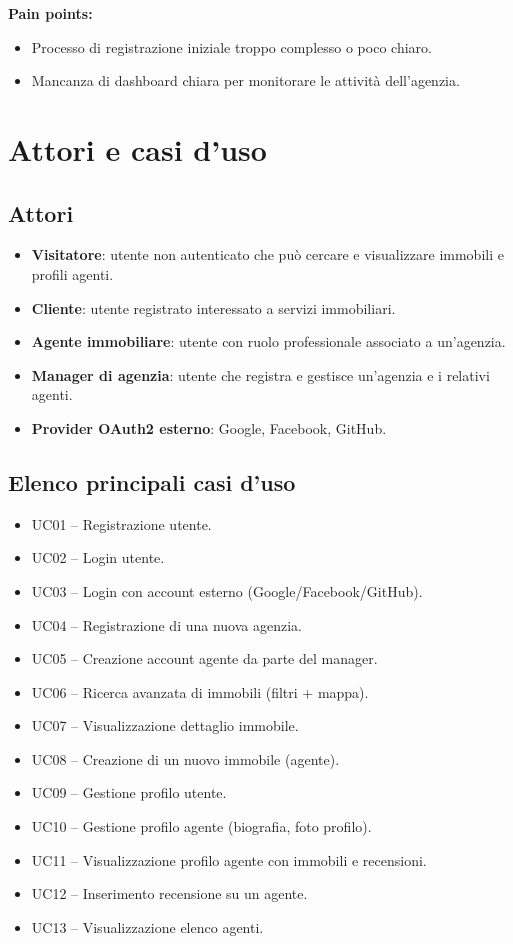 \documentclass[a4paper,11pt]{report}
\begin{document}
\textbf{Pain points:}
\begin{itemize}[nosep]
  \item Processo di registrazione iniziale troppo complesso o poco chiaro.
  \item Mancanza di dashboard chiara per monitorare le attività dell'agenzia.
\end{itemize}
\pagebreak

\section{Attori e casi d’uso}

\subsection{Attori}

\begin{itemize}[nosep]
  \item \textbf{Visitatore}: utente non autenticato che può cercare e visualizzare immobili e profili agenti.
  \item \textbf{Cliente}: utente registrato interessato a servizi immobiliari.
  \item \textbf{Agente immobiliare}: utente con ruolo professionale associato a un’agenzia.
  \item \textbf{Manager di agenzia}: utente che registra e gestisce un’agenzia e i relativi agenti.
  \item \textbf{Provider OAuth2 esterno}: Google, Facebook, GitHub.
\end{itemize}

\subsection{Elenco principali casi d’uso}

\begin{itemize}[nosep]
  \item UC01 -- Registrazione utente.
  \item UC02 -- Login utente.
  \item UC03 -- Login con account esterno (Google/Facebook/GitHub).
  \item UC04 -- Registrazione di una nuova agenzia.
  \item UC05 -- Creazione account agente da parte del manager.
  \item UC06 -- Ricerca avanzata di immobili (filtri + mappa).
  \item UC07 -- Visualizzazione dettaglio immobile.
  \item UC08 -- Creazione di un nuovo immobile (agente).
  \item UC09 -- Gestione profilo utente.
  \item UC10 -- Gestione profilo agente (biografia, foto profilo).
  \item UC11 -- Visualizzazione profilo agente con immobili e recensioni.
  \item UC12 -- Inserimento recensione su un agente.
  \item UC13 -- Visualizzazione elenco agenti.
\end{itemize}
\pagebreak
\end{document}
